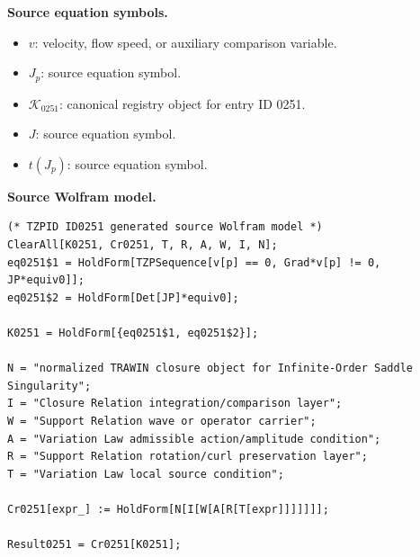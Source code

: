 \begin{minipage}[t]{0.49\linewidth}
\begingroup
\small
\raggedright
\textbf{Source equation symbols.}\par
\begin{itemize}[leftmargin=1.35em,itemsep=1pt,topsep=1pt,parsep=0pt]
    \item $v$: velocity, flow speed, or auxiliary comparison variable.
    \item $J_p$: source equation symbol.
    \item $\mathcal{K}_{0251}$: canonical registry object for entry ID 0251.
    \item $J$: source equation symbol.
    \item $t(J_p)$: source equation symbol.
\end{itemize}
\endgroup
\end{minipage}\hfill
\begin{minipage}[t]{0.47\linewidth}
\begingroup
\scriptsize
\raggedright
\textbf{Source Wolfram model.}\par
\begin{Verbatim}[fontsize=\tiny,breaklines=true,breakanywhere=true]
(* TZPID ID0251 generated source Wolfram model *)
ClearAll[K0251, Cr0251, T, R, A, W, I, N];
eq0251$1 = HoldForm[TZPSequence[v[p] == 0, Grad*v[p] != 0, JP*equiv0]];
eq0251$2 = HoldForm[Det[JP]*equiv0];

K0251 = HoldForm[{eq0251$1, eq0251$2}];

N = "normalized TRAWIN closure object for Infinite-Order Saddle Singularity";
I = "Closure Relation integration/comparison layer";
W = "Support Relation wave or operator carrier";
A = "Variation Law admissible action/amplitude condition";
R = "Support Relation rotation/curl preservation layer";
T = "Variation Law local source condition";

Cr0251[expr_] := HoldForm[N[I[W[A[R[T[expr]]]]]]];

Result0251 = Cr0251[K0251];
\end{Verbatim}
\endgroup
\end{minipage}

